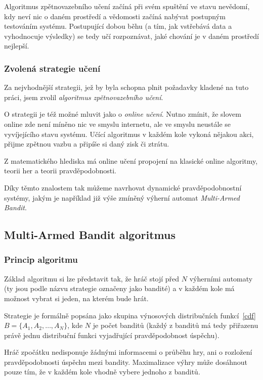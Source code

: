 \documentclass[thesis=M,czech]{FITthesis}[2014/05/07]
\begin{document}
Algoritmus zpětnovazebního učení začíná při svém spuštění ve stavu nevědomí, kdy neví nic o daném prostředí a vědomosti začíná nabývat postupným testováním systému. Postupující dobou běhu (a tím, jak vstřebává data a vyhodnocuje výsledky) se tedy učí rozpoznávat, jaké chování je v daném prostředí nejlepší.

\subsubsection{Zvolená strategie učení}
\label{sub:online}
Za nejvhodnější strategii, jež by byla schopna plnit požadavky kladené na tuto práci, jsem zvolil \emph{algoritmus zpětnovazebního učení}.

O strategii je též možné mluvit jako o \emph{online učení}. Nutno zmínit, že slovem online zde není míněno nic ve smyslu internetu, ale ve smyslu neustále se vyvíjejícího stavu systému. Učící algoritmus v každém kole vykoná nějakou akci, přijme zpětnou vazbu a připíše si daný zisk či ztrátu.

Z matematického hlediska má online učení propojení na klasické online algoritmy, teorii her a teorii pravděpodobnosti.

Díky těmto znalostem tak můžeme navrhovat dynamické pravděpodobnostní systémy, jakým je například již výše zmíněný výherní automat \emph{Multi-Armed Bandit}.

\subsection{Multi-Armed Bandit algoritmus}
\label{sec:multi}

\subsubsection{Princip algoritmu}
Základ algoritmu si lze představit tak, že hráč stojí před $N$ výherními automaty (ty jsou podle názvu strategie označeny jako bandité) a v každém kole má možnost vybrat si jeden, na kterém bude hrát.

Strategie je formálně popsána jako skupina výnosových distribučních funkcí~\ref{cdf} $B = \{ A_1, A_2, \ldots, A_N \}$, kde $N$ je počet banditů (každý z banditů má tedy přiřazenu právě jednu distribuční funkci vyjadřující pravděpodobnost úspěchu). 

Hráč zpočátku nedisponuje žádnými informacemi o průběhu hry, ani o rozložení pravděpodobnosti úspěchu mezi bandity. Maximalizace výhry může dosáhnout pouze tím, že v každém kole vhodně vybere jednoho z banditů.
\end{document}
